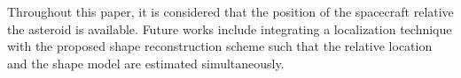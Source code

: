 \documentclass[smallextended]{svjour3}       %
\begin{document}
Throughout this paper, it is considered that the position of the spacecraft relative the asteroid is available. 
Future works include integrating a localization technique with the proposed shape reconstruction scheme such that the relative location and the shape model are estimated simultaneously.



\end{document}
